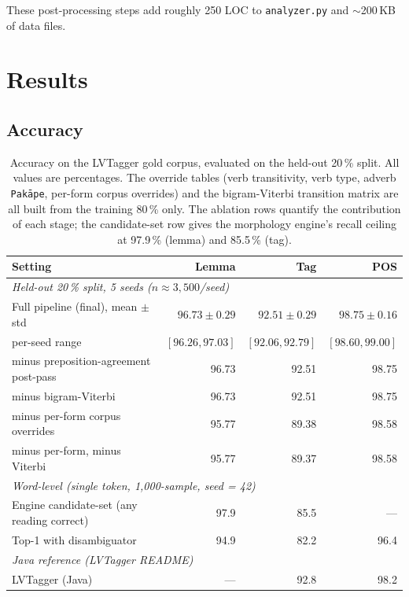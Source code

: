\documentclass[11pt,a4paper]{article}
\begin{document}
These post-processing steps add roughly 250 LOC to \texttt{analyzer.py} and
$\sim$200\,KB of data files.

\section{Results}

\subsection{Accuracy}

\begin{table}[h]
\centering
\small
\begin{tabular}{lrrr}
\toprule
\textbf{Setting} & \textbf{Lemma} & \textbf{Tag} & \textbf{POS} \\
\midrule
\multicolumn{4}{l}{\textit{Held-out 20\,\% split, 5 seeds ($n \approx 3{,}500$/seed)}}\\
Full pipeline (final), mean $\pm$ std & $\mathbf{96.73 \pm 0.29}$ & $\mathbf{92.51 \pm 0.29}$ & $\mathbf{98.75 \pm 0.16}$ \\
\quad per-seed range & $[96.26, 97.03]$ & $[92.06, 92.79]$ & $[98.60, 99.00]$ \\
\quad minus preposition-agreement post-pass & 96.73 & 92.51 & 98.75 \\
\quad minus bigram-Viterbi & 96.73 & 92.51 & 98.75 \\
\quad minus per-form corpus overrides & 95.77 & 89.38 & 98.58 \\
\quad minus per-form, minus Viterbi & 95.77 & 89.37 & 98.58 \\
\midrule
\multicolumn{4}{l}{\textit{Word-level (single token, 1{,}000-sample, seed = 42)}}\\
Engine candidate-set (any reading correct) & 97.9 & 85.5 & --- \\
Top-1 with disambiguator & 94.9 & 82.2 & 96.4 \\
\midrule
\multicolumn{4}{l}{\textit{Java reference (LVTagger README)}}\\
LVTagger (Java) & --- & 92.8 & 98.2 \\
\bottomrule
\end{tabular}
\caption{Accuracy on the LVTagger gold corpus, evaluated on the
held-out 20\,\% split. All values are percentages. The override
tables (verb transitivity, verb type, adverb
\texttt{Pakāpe}, per-form corpus overrides) and the bigram-Viterbi
transition matrix are all built from the training 80\,\% only. The
ablation rows quantify the contribution of each stage; the
candidate-set row gives the morphology engine's recall ceiling at
97.9\,\% (lemma) and 85.5\,\% (tag).}
\label{tab:accuracy}
\end{table}
\end{document}
